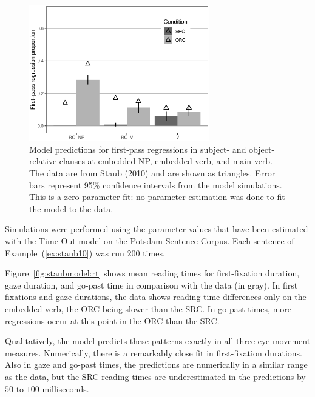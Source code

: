 \documentclass{cambridge7A}\usepackage[]{graphicx}\usepackage[]{color}
\newenvironment{knitrout}{}{} %
\begin{document}
\begin{figure}[tb]
  \centering
\begin{knitrout}
\color{fgcolor}

{\centering \includegraphics[width=0.7\textwidth]{figures/fig-staub10modelREG-1} 

}



\end{knitrout}
\caption[Predicted first-pass regressions from the model for subject- and object-relative clauses.]{Model predictions for first-pass regressions in subject- and object-relative clauses at embedded NP, embedded verb, and main verb. The data are from Staub (2010) and are shown as triangles. Error bars represent 95\% confidence intervals from the model simulations. This is a zero-parameter fit: no parameter estimation was done to fit the model to the data.} \label{fig:staubmodel:reg}
\end{figure}

Simulations were performed using the parameter values that have been estimated with the Time Out model on the Potsdam Sentence Corpus. Each sentence of Example~(\ref{ex:staub10}) was run $200$ times.

Figure~\ref{fig:staubmodel:rt} shows mean reading times for first-fixation duration, gaze duration, and go-past time in comparison with the data (in gray). 
In first fixations and gaze durations, the \cite{Staub2010a} data shows reading time differences only on the embedded verb, the  ORC being slower than the  SRC. In go-past times, more regressions occur at this point in the ORC than the SRC.

Qualitatively, the model predicts these patterns exactly in all three eye movement measures. Numerically, there is a remarkably close fit in first-fixation durations. Also in gaze and go-past times, the predictions are numerically in a similar range as the data, but the SRC reading times are underestimated in the predictions by $50$ to $100$ milliseconds.
\end{document}
